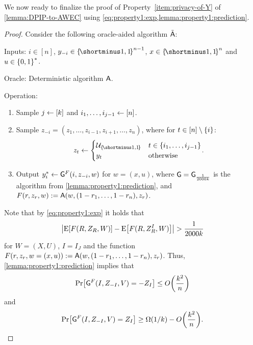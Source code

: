 \begin{lemma}\label{lemma:property1:prediction}
    \PredictionLemma
\end{lemma}

We now ready to finalize the proof of Property~\ref{item:privacy-of-Y} of \cref{lemma:DPIP-to-AWEC} using \cref{eq:property1:exp,lemma:property1:prediction}.

\begin{proof}
	
	Consider the following oracle-aided algorithm ${\tilde{\mathsf{A}}}$:
	
	\begin{algorithm}\label{alg:Act}
		\item Inputs: $i \in [n]$, $y_{-i} \in \oo^{n-1}$, $x \in \oo^n$ and $u \in \zo^*$.
		\item Oracle: Deterministic algorithm $\mathsf{A}$.%
		\item Operation:~
		\begin{enumerate}
			\item Sample $j \gets [k]$ and $i_1,\ldots,i_{j-1} \gets [n]$.
			
			\item Sample $z_{-i} = (z_1,\ldots,z_{i-1}, z_{i+1},\ldots, z_n)$, where for $t \in [n]\setminus \set{i}$: $$z_{t} \la \begin{cases} \cU_{\oo} & t \in \set{i_1,\ldots,i_{j-1}} \\ y_t & \text{otherwise} \end{cases}.$$\label{step:z-i}
			
			\item Output $y_i^* \gets \mathsf{G}^{F}(i,z_{-i},w)$ for $w=(x,u)$, where $\mathsf{G} = \mathsf{G}_{\frac1{2000 k}}$ is the algorithm from \cref{lemma:property1:prediction}, and $F(r,z_r,w) := \mathsf{A}(w,(1-r_1,\ldots,1-r_n), z_r)$.
		\end{enumerate}
	\end{algorithm}

	Note that by \cref{eq:property1:exp} it holds that
	\begin{align*}
		\size{\ex{F(R,Z_{R}, W)} - \ex{F(R,Z_{R}^{I},W)}} > \frac1{2000 k}
	\end{align*}
	for $W = (X,U)$, $I = I_J$ and the function $F(r,z_r,w=(x,u)) := \mathsf{A}(w,(1-r_1,\ldots,1-r_n), z_r)$. Thus, \cref{lemma:property1:prediction} implies that
	\begin{align}\label{eq:G:LB}
		\pr{\Gc^{F}(I,Z_{-I}, V) = -Z_I} \leq O\paren{\frac{k^2}{n}}
	\end{align}
	and
	\begin{align}\label{eq:G:UB}
		\pr{\Gc^{F}(I,Z_{-I}, V) = Z_I} \geq \Omega(1/k) - O\paren{\frac{k^2}{n}}.
	\end{align} 
	

\end{proof}
